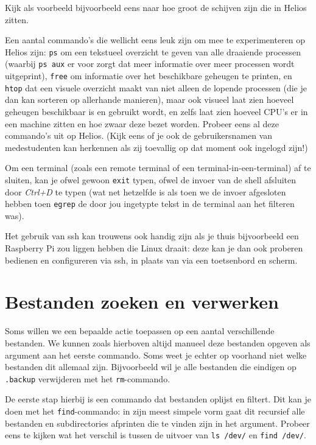 \documentclass[a4paper,twoside,openany]{memoir}
\begin{document}
Kijk als voorbeeld bijvoorbeeld eens naar hoe groot de schijven zijn die in
Helios zitten.

Een aantal commando's die wellicht eens leuk zijn om mee te experimenteren op
Helios zijn: \verb!ps! om een tekstueel overzicht te geven van alle draaiende
processen (waarbij \verb!ps aux! er voor zorgt dat meer informatie over meer
processen wordt uitgeprint), \verb!free! om informatie over het beschikbare
geheugen te printen, en \verb!htop! dat een visuele overzicht maakt van niet
alleen de lopende processen (die je dan kan sorteren op allerhande manieren),
maar ook visueel laat zien hoeveel geheugen beschikbaar is en gebruikt wordt, 
en zelfs laat zien hoeveel CPU's er in een machine zitten en hoe zwaar deze bezet
worden. Probeer eens al deze commando's uit op Helios. (Kijk eens of je ook de
gebruikersnamen van medestudenten kan herkennen als zij toevallig op dat moment
ook ingelogd zijn!)

Om een terminal (zoals een remote terminal of een terminal-in-een-terminal) af
te sluiten, kan je ofwel gewoon \verb!exit! typen, ofwel de invoer van de shell
afsluiten door \emph{Ctrl+D} te typen (wat net hetzelfde is als toen we de
invoer afgesloten hebben toen \verb!egrep! de door jou ingetypte tekst in de
terminal aan het filteren was).

Het gebruik van ssh kan trouwens ook handig zijn als je thuis bijvoorbeeld een
Raspberry Pi zou liggen hebben die Linux draait: deze kan je dan ook proberen
bedienen en configureren via ssh, in plaats van via een toetsenbord en scherm.

\chapter{Bestanden zoeken en verwerken}

Soms willen we een bepaalde actie toepassen op een aantal verschillende
bestanden. We kunnen zoals hierboven altijd manueel deze bestanden opgeven als
argument aan het eerste commando. Soms weet je echter op voorhand niet welke
bestanden dit allemaal zijn. Bijvoorbeeld wil je alle bestanden die eindigen op
\verb!.backup! verwijderen met het \verb!rm!-commando.

De eerste stap hierbij is een commando dat bestanden oplijst en filtert. Dit
kan je doen met het \verb!find!-commando: in zijn meest simpele vorm gaat dit
recursief alle bestanden en subdirectories afprinten die te vinden zijn in het
argument. Probeer eens te kijken wat het verschil is tussen de uitvoer van
\verb!ls /dev/! en \verb!find /dev/!.
\end{document}
